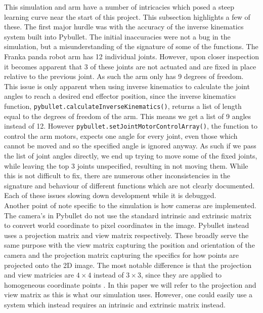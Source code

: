 This simulation and arm have a number of intricacies which posed a steep learning curve near the start of this project. This subsection highlights a few of these. The first major hurdle was with the accuracy of the inverse kinematics system built into Pybullet. The initial inaccuracies were not a bug in the simulation, but a misunderstanding of the signature of some of the functions.
The Franka panda robot arm has 12 individual joints. However, upon closer inspection it becomes apparent that 3 of these joints are not actuated and are fixed in place relative to the previous joint. As such the arm only has 9 degrees of freedom. This issue is only apparent when using inverse kinematics to calculate the joint angles to reach a desired end effector position, since the inverse kinematics function, \verb|pybullet.calculateInverseKinematics()|, returns a list of length equal to the degrees of freedom of the arm. This means we get a list of 9 angles instead of 12. However \verb|pybullet.setJointMotorControlArray()|, the function to control the arm motors, expects one angle for every joint, even those which cannot be moved and so the specified angle is ignored anyway. As such if we pass the list of joint angles directly, we end up trying to move some of the fixed joints, while leaving the top 3 joints unspecified, resulting in not moving them. While this is not difficult to fix, there are numerous other inconsistencies in the signature and behaviour of different functions which are not clearly documented. Each of these issues slowing down development while it is debugged.\\

Another point of note specific to the simulation is how cameras are implemented. The camera's in Pybullet do not use the standard intrinsic and extrinsic matrix to convert world coordinate to pixel coordinates in the image. Pybullet instead uses a projection matrix and view matrix respectively. These broadly serve the same purpose with the view matrix capturing the position and orientation of the camera and the projection matrix capturing the specifics for how points are projected onto the 2D image. The most notable difference is that the projection and view matricies are $4\times4$ instead of $3\times3$, since they are applied to homogeneous coordinate points \cite{homogenous-coords}. In this paper we will refer to the projection and view matrix as this is what our simulation uses. However, one could easily use a system which instead requires an intrinsic and extrinsic matrix instead.\\

